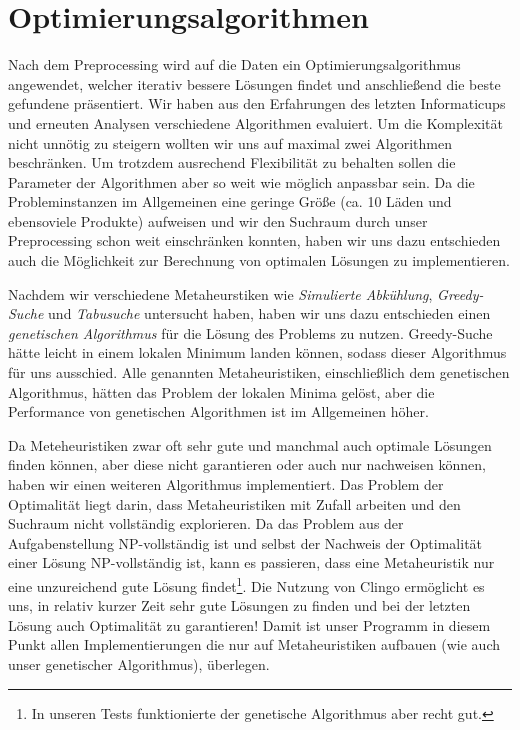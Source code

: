 \section{Optimierungsalgorithmen}

Nach dem Preprocessing wird auf die Daten ein Optimierungsalgorithmus angewendet, welcher iterativ bessere Lösungen findet und anschließend die beste gefundene präsentiert. Wir haben aus den Erfahrungen des letzten Informaticups und erneuten Analysen verschiedene Algorithmen evaluiert. Um die Komplexität nicht unnötig zu steigern wollten wir uns auf maximal zwei Algorithmen beschränken. Um trotzdem ausrechend Flexibilität zu behalten sollen die Parameter der Algorithmen aber so weit wie möglich anpassbar sein. Da die Probleminstanzen im Allgemeinen eine geringe Größe (ca. 10 Läden und ebensoviele Produkte) aufweisen und wir den Suchraum durch unser Preprocessing schon weit einschränken konnten, haben wir uns dazu entschieden auch die Möglichkeit zur Berechnung von optimalen Lösungen zu implementieren. 

Nachdem wir verschiedene Metaheurstiken wie \emph{Simulierte Abkühlung}, \emph{Greedy-Suche} und \emph{Tabusuche} untersucht haben, haben wir uns dazu entschieden einen \emph{genetischen Algorithmus} für die Lösung des Problems zu nutzen. Greedy-Suche hätte leicht in einem lokalen Minimum landen können, sodass dieser Algorithmus für uns ausschied. Alle genannten Metaheuristiken, einschließlich dem genetischen Algorithmus, hätten das Problem der lokalen Minima gelöst, aber die Performance von genetischen Algorithmen ist im Allgemeinen höher. 

Da Meteheuristiken zwar oft sehr gute und manchmal auch optimale Lösungen finden können, aber diese nicht garantieren oder auch nur nachweisen können, haben wir einen weiteren Algorithmus implementiert. Das Problem der Optimalität liegt darin, dass Metaheuristiken mit Zufall arbeiten und den Suchraum nicht vollständig explorieren. Da das Problem aus der Aufgabenstellung NP-vollständig ist und selbst der Nachweis der Optimalität einer Lösung NP-vollständig ist, kann es passieren, dass eine Metaheuristik nur eine unzureichend gute Lösung findet\footnote{In unseren Tests funktionierte der genetische Algorithmus aber recht gut.}. Die Nutzung von Clingo ermöglicht es uns, in relativ kurzer Zeit sehr gute Lösungen zu finden und bei der letzten Lösung auch Optimalität zu garantieren! Damit ist unser Programm in diesem Punkt allen Implementierungen die nur auf Metaheuristiken aufbauen (wie auch unser genetischer Algorithmus), überlegen.

